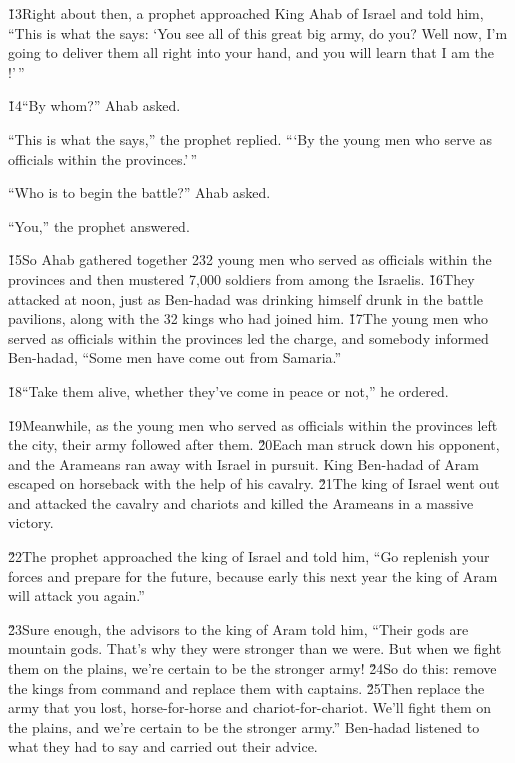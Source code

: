\v{13}Right about then, a prophet approached King Ahab of Israel and told him, ``This is what the  says: `You see all of this great big army, do you? Well now, I'm going to deliver them all right into your hand, and you will learn that I am the !'\,''

\v{14}``By whom?'' Ahab asked.

``This is what the  says,'' the prophet replied. ```By the young men who serve as officials within the provinces.'\,''

``Who is to begin the battle?'' Ahab asked.

``You,'' the prophet answered.

\v{15}So Ahab gathered together 232 young men who served as officials within the provinces and then mustered 7,000 soldiers from among the Israelis. \v{16}They attacked at noon, just as Ben-hadad was drinking himself drunk in the battle pavilions, along with the 32 kings who had joined him. \v{17}The young men who served as officials within the provinces led the charge, and somebody informed Ben-hadad, ``Some men have come out from Samaria.''

\v{18}``Take them alive, whether they've come in peace or not,'' he ordered.

\v{19}Meanwhile, as the young men who served as officials within the provinces left the city, their army followed after them. \v{20}Each man struck down his opponent, and the Arameans ran away with Israel in pursuit. King Ben-hadad of Aram escaped on horseback with the help of his cavalry. \v{21}The king of Israel went out and attacked the cavalry and chariots and killed the Arameans in a massive victory.

\v{22}The prophet approached the king of Israel and told him, ``Go replenish your forces and prepare for the future, because early this next year the king of Aram will attack you again.''

\v{23}Sure enough, the advisors to the king of Aram told him, ``Their gods are mountain gods. That's why they were stronger than we were. But when we fight them on the plains, we're certain to be the stronger army! \v{24}So do this: remove the kings from command and replace them with captains. \v{25}Then replace the army that you lost, horse-for-horse and chariot-for-chariot. We'll fight them on the plains, and we're certain to be the stronger army.'' Ben-hadad listened to what they had to say and carried out their advice.

